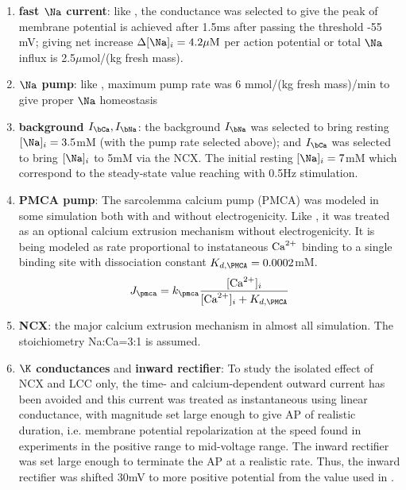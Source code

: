 \begin{enumerate}
  \item {\bf fast $\Na$ current}: like \citep{difrancesco1985mcea}, the
  conductance was selected to give the peak of membrane potential is achieved after 1.5ms
  after passing the threshold -55 mV; giving net increase $\Delta [\Na]_i =
  4.2\muM$ per action potential or total $\Na$ influx is 2.5$\mu$mol/(kg fresh
  mass).
  \item {\bf $\Na$ pump}: like \citep{difrancesco1985mcea}, maximum pump rate
  was 6 mmol/(kg fresh mass)/min to give proper $\Na$ homeostasis
  
  \item {\bf background $I_\bCa, I_\bNa$}: the background $I_\bNa$ was selected
  to bring resting $[\Na]_i=3.5$mM (with the pump rate selected above); and
  $I_\bCa$ was selected to bring $[\Na]_i$ to 5mM via the NCX. The initial resting
  $[\Na]_i=7$mM which correspond to the steady-state value reaching with 0.5Hz
  stimulation.  
  
  \item {\bf PMCA pump}: The sarcolemma calcium pump (PMCA) was modeled in some
  simulation both with and without electrogenicity. Like
  \citep{difrancesco1985mcea}, it was treated as an optional calcium extrusion
  mechanism without electrogenicity. It is being modeled as rate proportional to
  instataneous ${\text{Ca}^{2+}}$ binding to a single binding site with dissociation constant
  $K_{d,\PMCA}=0.0002$mM.
  \begin{equation}
    \label{eq:1418}
    J_\pmca = k_\pmca \frac{[\Ca]_i}{[\Ca]_i+K_{d,\PMCA}}
  \end{equation}
  

  \item {\bf NCX}: the major calcium extrusion mechanism in almost all
  simulation. The stoichiometry Na:Ca=3:1 is assumed.

  

  
  \item {\bf $\K$ conductances} and {\bf inward rectifier}: To study the
  isolated effect of NCX and LCC only, the time- and calcium-dependent outward
  current has been avoided and this current was treated as instantaneous using
  linear conductance, with magnitude set large enough to give AP of realistic
  duration, i.e. membrane potential repolarization at the speed found in
  experiments in the positive range to mid-voltage range. The inward rectifier
  was set large enough to terminate the AP at a realistic rate.
  Thus, the inward rectifier was shifted 30mV to more positive potential from
  the value used in \citep{difrancesco1985mcea}.
  

\end{enumerate}
